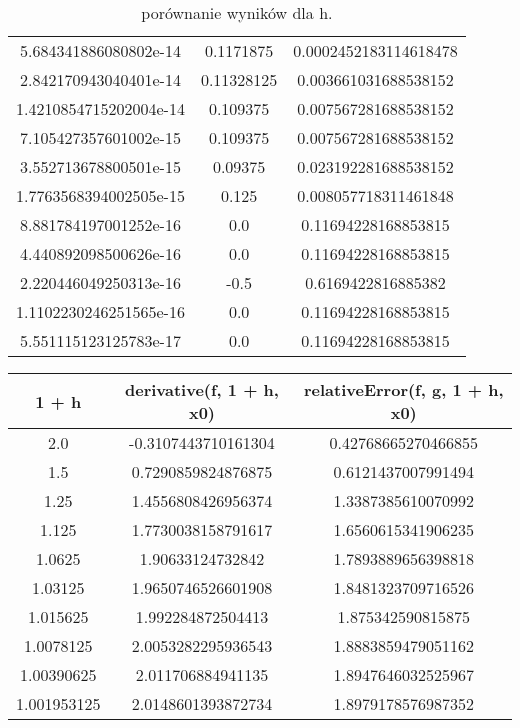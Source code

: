 \documentclass{article}
\begin{document}
\begin{center}
\begin{table}[h!]
\begin{tabular}{||c c c||}
     5.684341886080802e-14 & 0.1171875 & 0.0002452183114618478 \\ 
     2.842170943040401e-14 &  0.11328125 & 0.003661031688538152 \\ 
     1.4210854715202004e-14 & 0.109375 & 0.007567281688538152 \\ 
     7.105427357601002e-15 & 0.109375 & 0.007567281688538152 \\ 
     3.552713678800501e-15 & 0.09375 & 0.023192281688538152 \\ 
     1.7763568394002505e-15 & 0.125 & 0.008057718311461848 \\ 
     8.881784197001252e-16 & 0.0 & 0.11694228168853815 \\ 
     4.440892098500626e-16 & 0.0 & 0.11694228168853815 \\ 
     2.220446049250313e-16 & -0.5 & 0.6169422816885382 \\ 
     1.1102230246251565e-16 & 0.0 & 0.11694228168853815 \\ 
     5.551115123125783e-17 & 0.0 & 0.11694228168853815 \\ 
     \hline
     \end{tabular}
     \caption{porównanie wyników dla h.}
     \label{table:6}
     \end{table}
     \begin{table}[h!]
     \centering
     \begin{tabular}{||c c c||} 
     \hline
     \textbf{1 + h} & \textbf{derivative(f, 1 + h, x0)} & \textbf{relativeError(f, g, 1 + h, x0)} \\ [0.5ex]
     \hline\hline
     2.0 & -0.3107443710161304 & 0.42768665270466855 \\ 
     1.5 & 0.7290859824876875 & 0.6121437007991494 \\
     1.25 & 1.4556808426956374 & 1.3387385610070992 \\ 
     1.125 & 1.7730038158791617 & 1.6560615341906235 \\ 
     1.0625 & 1.90633124732842 & 1.7893889656398818 \\ 
     1.03125 & 1.9650746526601908 & 1.8481323709716526 \\ 
     1.015625 & 1.992284872504413 & 1.875342590815875 \\ 
     1.0078125 & 2.0053282295936543 & 1.8883859479051162 \\ 
     1.00390625 & 2.011706884941135 & 1.8947646032525967 \\ 
     1.001953125 & 2.0148601393872734 & 1.8979178576987352 \\ 

\end{tabular}
\end{table}
\end{center}
\end{document}
